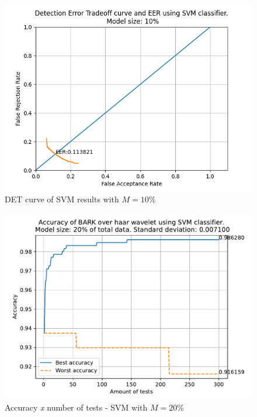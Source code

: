 	\begin{figure}[H]
		\centering
		\includegraphics[scale=.8]{images/results/det/DET_SVM_10}
		\caption{DET curve of SVM results with $M=10\%$}
		\label{fig:detsvm10}
	\end{figure}
	\begin{figure}[H]
		\centering
		\includegraphics[scale=.8]{images/results/confusionMatrices/classifier_SVM_20.pdf}
		\caption{Accuracy \textit{x} number of tests - SVM with $M=20\%$}
		\label{fig:classifiersvm20}
	\end{figure}
